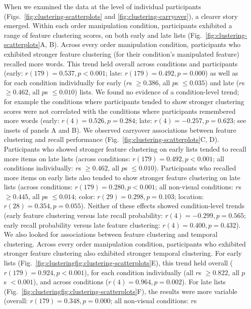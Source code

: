 \documentclass[11pt]{article}
\begin{document}
When we examined the data at the level of individual participants
(Figs.~\ref{fig:clustering-scatterplots} and \ref{fig:clustering-carryover}), a
clearer story emerged. Within each order manipulation condition, participants
exhibited a range of feature clustering scores, on both early and late lists
(Fig.~\ref{fig:clustering-scatterplots}A, B). Across every order manipulation
condition, participants who exhibited stronger feature clustering (for their
condition's manipulated feature) recalled more words. This trend held overall
across conditions and participants (early: $r(179) = 0.537, p < 0.001$; late: $
r(179) = 0.492, p = 0.000$) as well as for each condition individually for
early ($r$s $\geq 0.386$, all $p$s $\leq 0.035$) and late ($r$s $\geq 0.462$,
all $p$s $\leq 0.010$) lists. We found no evidence of a condition-level trend;
for example the conditions where participants tended to show stronger
clustering scores were not correlated with the conditions where participants
remembered more words (early: $r(4) = 0.526, p = 0.284$; late: $r(4) = -0.257,
p = 0.623$; see insets of panels A and B). We observed carryover associations
between feature clustering and recall performance
(Fig.~\ref{fig:clustering-scatterplots}C, D). Participants who showed stronger
feature clustering on early lists tended to recall more items on late lists
(across conditions: $r(179) = 0.492, p < 0.001$; all conditions individually:
$r$s $\geq 0.462$, all $p$s $\leq 0.010$). Participants who recalled more items
on early lists also tended to show stronger feature clustering on late lists
(across conditions: $r(179) = 0.280, p < 0.001$; all non-visual conditions:
$r$s $\geq 0.445$, all $p$s $\leq 0.014$; color: $r(29) = 0.298, p = 0.103$;
location: $r(28) = 0.354, p = 0.055$). Neither of these effects showed
condition-level trends (early feature clustering versus late recall
probability: $r(4) = -0.299, p = 0.565$; early recall probability versus late
feature clustering: $r(4) = 0.400, p = 0.432$). We also looked for associations
between feature clustering and temporal clustering. Across every order
manipulation condition, participants who exhibited stronger feature clustering
also exhibited stronger temporal clustering. For early lists
(Fig.~\ref{fig:clusteringfig:clustering-scatterplots}E), this trend held
overall ($r(179) = 0.924, p < 0.001$), for each condition individually (all
$r$s $\geq 0.822$, all $p$s $< 0.001$), and across conditions ($r(4) = 0.964, p
= 0.002$). For late lists
(Fig.~\ref{fig:clusteringfig:clustering-scatterplots}F), the results were more
variable (overall: $r(179) = 0.348, p = 0.000$; all non-visual conditions: $r$s
\end{document}
